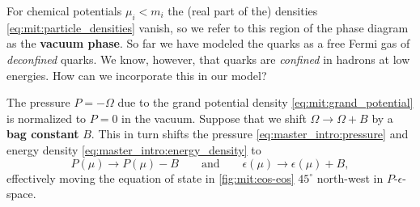 For chemical potentials $\mu_i < m_i$ the (real part of the) densities \eqref{eq:mit:particle_densities} vanish,
so we refer to this region of the phase diagram as the \textbf{vacuum phase}.
So far we have modeled the quarks as a free Fermi gas of \emph{deconfined} quarks.
We know, however, that quarks are \emph{confined} in hadrons at low energies.
How can we incorporate this in our model?

The pressure $P = -\Omega$ due to the grand potential density \eqref{eq:mit:grand_potential} is normalized to $P = 0$ in the vacuum.
Suppose that we shift $\Omega \rightarrow \Omega + B$ by a \textbf{bag constant} $B$.
This in turn shifts the pressure \eqref{eq:master_intro:pressure} and energy density \eqref{eq:master_intro:energy_density} to
\begin{equation}
	P(\mu) \rightarrow P(\mu) - B
	\qquad \text{and} \qquad
	\epsilon(\mu) \rightarrow \epsilon(\mu) + B,
\label{eq:mit:bag_shift}
\end{equation}
effectively moving the equation of state in \cref{fig:mit:eos-eos} $45^\circ$ north-west in $P$-$\epsilon$-space.


